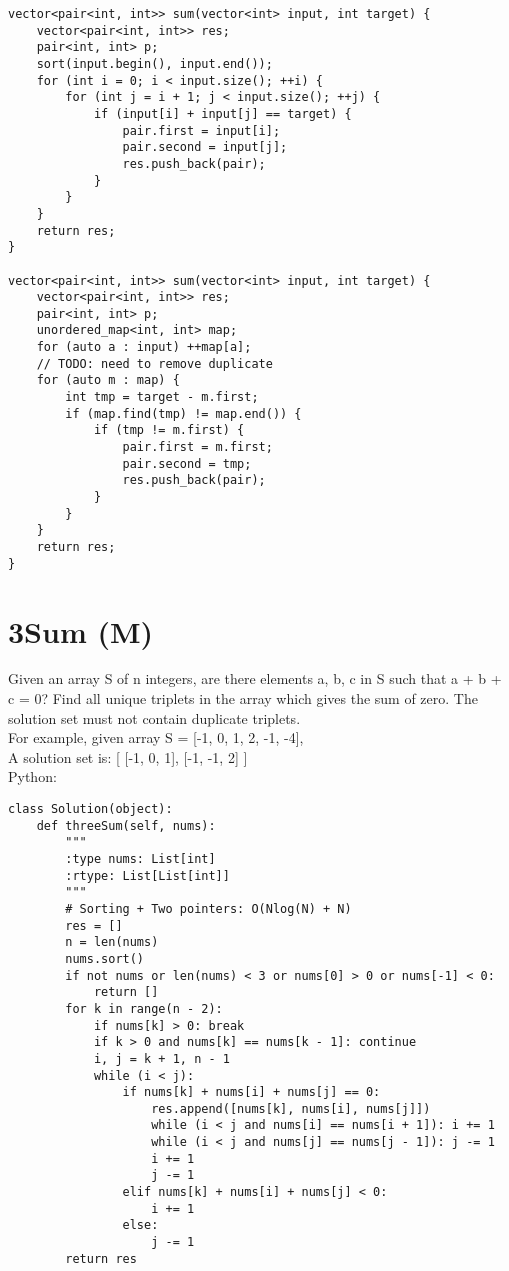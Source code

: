 \begin{lstlisting}
vector<pair<int, int>> sum(vector<int> input, int target) {
    vector<pair<int, int>> res;
    pair<int, int> p;
    sort(input.begin(), input.end());
    for (int i = 0; i < input.size(); ++i) {
        for (int j = i + 1; j < input.size(); ++j) {
            if (input[i] + input[j] == target) {
                pair.first = input[i];
                pair.second = input[j];
                res.push_back(pair);
            }
        }
    }
    return res;
}

vector<pair<int, int>> sum(vector<int> input, int target) {
    vector<pair<int, int>> res;
    pair<int, int> p;
    unordered_map<int, int> map;
    for (auto a : input) ++map[a];
    // TODO: need to remove duplicate
    for (auto m : map) {
        int tmp = target - m.first;
        if (map.find(tmp) != map.end()) {
            if (tmp != m.first) {
                pair.first = m.first;
                pair.second = tmp;
                res.push_back(pair);
            }
        }
    }
    return res;
}
\end{lstlisting}

\section{3Sum (M)}
Given an array S of n integers, are there elements a, b, c in S such that a + b + c = 0? Find all unique triplets in the array which gives the sum of zero. The solution set must not contain duplicate triplets.\\

For example, given array S = [-1, 0, 1, 2, -1, -4], \\
A solution set is:
[
  [-1, 0, 1],
  [-1, -1, 2]
] \\

Python:
\lstset{language=python}
\begin{lstlisting}
class Solution(object):
    def threeSum(self, nums):
        """
        :type nums: List[int]
        :rtype: List[List[int]]
        """
        # Sorting + Two pointers: O(Nlog(N) + N)
        res = []
        n = len(nums)
        nums.sort()
        if not nums or len(nums) < 3 or nums[0] > 0 or nums[-1] < 0: 
            return []
        for k in range(n - 2):
            if nums[k] > 0: break
            if k > 0 and nums[k] == nums[k - 1]: continue
            i, j = k + 1, n - 1
            while (i < j):
                if nums[k] + nums[i] + nums[j] == 0:
                    res.append([nums[k], nums[i], nums[j]])
                    while (i < j and nums[i] == nums[i + 1]): i += 1
                    while (i < j and nums[j] == nums[j - 1]): j -= 1
                    i += 1
                    j -= 1
                elif nums[k] + nums[i] + nums[j] < 0:
                    i += 1
                else:
                    j -= 1
        return res
\end{lstlisting}

